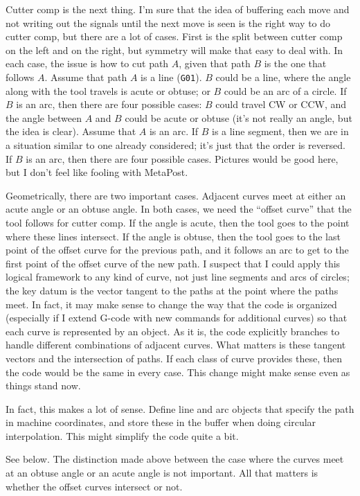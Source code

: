 \documentclass[titlepage,oneside,10pt]{article}
\begin{document}
Cutter comp is the next thing. I'm sure that the idea of buffering
each move and not writing out the signals until the next move is seen
is the right way to do cutter comp, but there are a lot of
cases. First is the split between cutter comp on the left and on the
right, but symmetry will make that easy to deal with. In each case,
the issue is how to cut path $A$, given that path $B$ is the one that
follows $A$. Assume that path $A$ is a line ({\tt G01}). $B$ could be
a line, where the angle along with the tool travels is acute or
obtuse; or $B$ could be an arc of a circle. If $B$ is an arc, then
there are four possible cases: $B$ could travel CW or CCW, and the
angle between $A$ and $B$ could be acute or obtuse (it's not really an
angle, but the idea is clear). Assume that $A$ is an arc. If $B$ is a
line segment, then we are in a situation similar to one already
considered; it's just that the order is reversed. If $B$ is an arc,
then there are four possible cases. Pictures would be good here, but I
don't feel like fooling with MetaPost.

Geometrically, there are two important cases. Adjacent curves meet at
either an acute angle or an obtuse angle. In both cases, we need the
``offset curve'' that the tool follows for cutter comp. If the angle
is acute, then the tool goes to the point where these lines
intersect. If the angle is obtuse, then the tool goes to the last
point of the offset curve for the previous path, and it follows an arc
to get to the first point of the offset curve of the new path. I
suspect that I could apply this logical framework to any kind of
curve, not just line segments and arcs of circles; the key datum is
the vector tangent to the paths at the point where the paths meet. In
fact, it may make sense to change the way that the code is organized
(especially if I extend G-code with new commands for additional
curves) so that each curve is represented by an object. As it is, the
code explicitly branches to handle different combinations of adjacent
curves. What matters is these tangent vectors and the intersection of
paths. If each class of curve provides these, then the code would be
the same in every case. This change might make sense even as things
stand now.

In fact, this makes a lot of sense. Define line and arc objects that
specify the path in machine coordinates, and store these in the buffer
when doing circular interpolation. This might simplify the code quite
a bit.

See below. The distinction made above between the case where the
curves meet at an obtuse angle or an acute angle is not important. All
that matters is whether the offset curves intersect or not.
\end{document}
